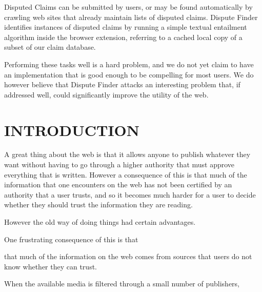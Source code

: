 \documentclass{www2010-submission}
\newcommand{\todo}[1]{}
\newcommand{\idea}[1]{}
\begin{document}
Disputed Claims can be submitted by users, or may be found automatically by crawling web sites that already maintain lists of disputed claims. Dispute Finder identifies instances of disputed claims by running a simple textual entailment algorithm inside the browser extension, referring to a cached local copy of a subset of our claim database.

Performing these tasks well is a hard problem, and we do not yet claim to have an implementation that is good enough to be compelling for most users. We do however believe that Dispute Finder attacks an interesting problem that, if addressed well, could significantly improve the utility of the web.







\section{INTRODUCTION}

\todo{update screenshots}

A great thing about the web is that it allows anyone to publish whatever they want without having to go through a higher authority that must approve everything that is written. However a consequence of this is that much of the information that one encounters on the web has not been certified by an authority that a user trusts, and so it becomes much harder for a user to decide whether they should trust the information they are reading.

\idea{Of course, old media wasn't entirely trustworthy either}

However the old way of doing things had certain advantages. 

One frustrating consequence of this is that 

 that much of the information on the web comes from sources that users do not know whether they can trust. 

When the available media is filtered through a small number of publishers, 
\end{document}
